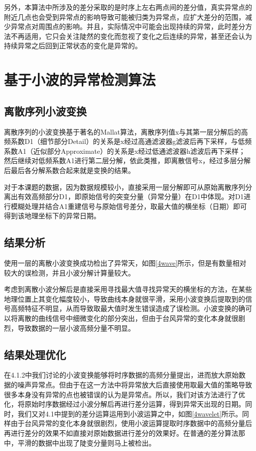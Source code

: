 \documentclass[a4paper,AutoFakeBold,oneside,12pt]{book}
\begin{document}
	另外，本算法中所涉及的差分采取的是时序上左右两点间的差分值，真实异常点的附近几点也会受到异常点的影响导致可能被归类为异常点，应扩大差分的范围，减少异常点对周围点的影响。并且，实际情况中可能会出现持续的异常，此时差分方法不再适用，它只会关注陡然的变化而忽视了变化之后连续的异常，甚至还会认为持续异常之后回到正常状态的变化是异常的。

\section{基于小波的异常检测算法}
\subsection{离散序列小波变换}
	离散序列的小波变换基于著名的Mallat算法，离散序列值x与其第一层分解后的高频系数D1（细节部分Detail）的关系是x经过高通滤波器g滤波后再下采样，与低频系数A1（近似部分Approximate）的关系是x经过低通滤波器h滤波后再下采样；然后继续对低频系数A1进行第二层分解，依此类推，即离散信号x，经过多层分解后最后各分解系数合起来就是变换的结果。

	对于本课题的数据，因为数据规模较小，直接采用一层分解即可从原始离散序列分离出有效高频部分D1，即原始信号的突变分量（异常分量）在D1中体现。对D1进行模糊处理并结合A1重建信号与原始信号差分，取最大值的横坐标（日期）即可得到该地理坐标下的异常日期。

\subsection{结果分析}
	使用一层的离散小波变换成功检出了异常天，如图\ref{4wave}所示，但是有数量相对较大的误检测，并且小波分解计算量较大。


	考虑到离散小波分解后是直接采用寻找最大值寻找异常天的横坐标的方法，在某些地理位置上其变化幅度较小，导致曲线本身就很平滑，采用小波变换后提取到的信号高频特征不明显，从而导致取最大值时发生错误造成了误检测。小波变换的确可以将离散的曲线信号中细微变化的部分突出，但由于台风异常的变化本身就很剧烈，导致数据的一层小波高频分量不明显。

\subsection{结果处理优化}
	在4.1.2中我们讨论的小波变换能够将时序数据的高频分量提出，进而放大原始数据的噪声异常点。但由于在这一方法中将异常放大后直接使用取最大值的策略导致很多本身没有异常的点也被错误的认为是异常点。所以，我们对该方法进行了优化，将原始时序数据经过小波分解后再进行差分运算，得到异常天出现的日期。同时，我们又对4.1中提到的差分运算运用到小波运算之中，如图\ref{4wavelet}所示。同样由于台风异常的变化本身就很剧烈，使用小波运算提取时序数据中的高频分量后再进行差分的效果不如直接对原始数据进行差分的效果好。在普通的差分算法那中，平滑的数据中出现了陡变分量则马上被检出。
\end{document}
